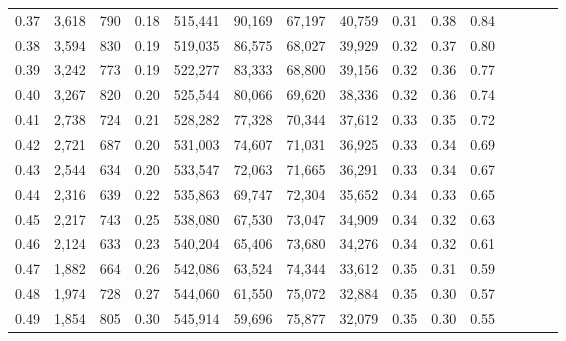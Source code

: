 \begin{tabular}{rrrcrrrrrrrrrrr}
0.37 &   3,618 &    790 &                                       0.18 &  515,441 &   90,169 &   67,197 &   40,759 &  0.31 &  0.38 &                         0.84 \\
0.38 &   3,594 &    830 &                                       0.19 &  519,035 &   86,575 &   68,027 &   39,929 &  0.32 &  0.37 &                         0.80 \\
0.39 &   3,242 &    773 &                                       0.19 &  522,277 &   83,333 &   68,800 &   39,156 &  0.32 &  0.36 &                         0.77 \\
0.40 &   3,267 &    820 &                                       0.20 &  525,544 &   80,066 &   69,620 &   38,336 &  0.32 &  0.36 &                         0.74 \\
0.41 &   2,738 &    724 &                                       0.21 &  528,282 &   77,328 &   70,344 &   37,612 &  0.33 &  0.35 &                         0.72 \\
0.42 &   2,721 &    687 &                                       0.20 &  531,003 &   74,607 &   71,031 &   36,925 &  0.33 &  0.34 &                         0.69 \\
0.43 &   2,544 &    634 &                                       0.20 &  533,547 &   72,063 &   71,665 &   36,291 &  0.33 &  0.34 &                         0.67 \\
0.44 &   2,316 &    639 &                                       0.22 &  535,863 &   69,747 &   72,304 &   35,652 &  0.34 &  0.33 &                         0.65 \\
0.45 &   2,217 &    743 &                                       0.25 &  538,080 &   67,530 &   73,047 &   34,909 &  0.34 &  0.32 &                         0.63 \\
0.46 &   2,124 &    633 &                                       0.23 &  540,204 &   65,406 &   73,680 &   34,276 &  0.34 &  0.32 &                         0.61 \\
0.47 &   1,882 &    664 &                                       0.26 &  542,086 &   63,524 &   74,344 &   33,612 &  0.35 &  0.31 &                         0.59 \\
0.48 &   1,974 &    728 &                                       0.27 &  544,060 &   61,550 &   75,072 &   32,884 &  0.35 &  0.30 &                         0.57 \\
0.49 &   1,854 &    805 &                                       0.30 &  545,914 &   59,696 &   75,877 &   32,079 &  0.35 &  0.30 &                         0.55 \\

\end{tabular}
